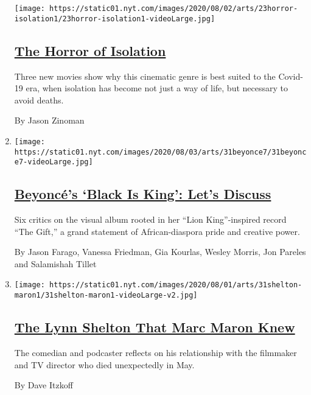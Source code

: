 \begin{enumerate}
  \texttt{[image: https://static01.nyt.com/images/2020/08/02/arts/23horror-isolation1/23horror-isolation1-videoLarge.jpg]}

  \hypertarget{the-horror-of-isolation}{%
  \subsection{\texorpdfstring{\href{/2020/07/29/movies/horror-she-dies-tomorrow-relic-amulet.html}{The
  Horror of
  Isolation}}{The Horror of Isolation}}\label{the-horror-of-isolation}}

  Three new movies show why this cinematic genre is best suited to the
  Covid-19 era, when isolation has become not just a way of life, but
  necessary to avoid deaths.

  By Jason Zinoman
\item
  \texttt{[image: https://static01.nyt.com/images/2020/08/03/arts/31beyonce7/31beyonce7-videoLarge.jpg]}

  \hypertarget{beyoncuxe9s-black-is-king-lets-discuss}{%
  \subsection{\texorpdfstring{\href{/2020/07/31/arts/music/beyonce-black-is-king.html}{Beyoncé's
  `Black Is King': Let's
  Discuss}}{Beyoncé's `Black Is King': Let's Discuss}}\label{beyoncuxe9s-black-is-king-lets-discuss}}

  Six critics on the visual album rooted in her ``Lion King''-inspired
  record ``The Gift,'' a grand statement of African-diaspora pride and
  creative power.

  By Jason Farago, Vanessa Friedman, Gia Kourlas, Wesley Morris, Jon
  Pareles and Salamishah Tillet
\item
  \texttt{[image: https://static01.nyt.com/images/2020/08/01/arts/31shelton-maron1/31shelton-maron1-videoLarge-v2.jpg]}

  \hypertarget{the-lynn-shelton-that-marc-maron-knew}{%
  \subsection{\texorpdfstring{\href{/2020/07/31/movies/marc-maron-lynn-shelton.html}{The
  Lynn Shelton That Marc Maron
  Knew}}{The Lynn Shelton That Marc Maron Knew}}\label{the-lynn-shelton-that-marc-maron-knew}}

  The comedian and podcaster reflects on his relationship with the
  filmmaker and TV director who died unexpectedly in May.

  By Dave Itzkoff
\end{enumerate}

